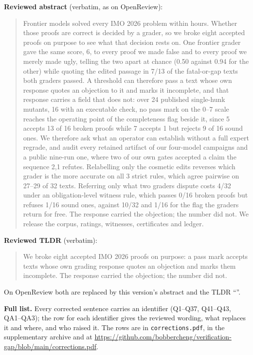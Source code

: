 \textbf{Reviewed abstract} (verbatim, as on OpenReview):
\begin{quote}\footnotesize
Frontier models solved every IMO 2026 problem within hours. Whether those proofs are correct is decided by a grader, so we broke eight accepted proofs on purpose to see what that decision rests on. One frontier grader gave the same score, 6, to every proof we made false and to every proof we merely made ugly, telling the two apart at chance (0.50 against 0.94 for the other) while quoting the edited passage in 7/13 of the fatal-or-gap texts both graders passed. A threshold can therefore pass a text whose own response quotes an objection to it and marks it incomplete, and that response carries a field that does not: over 24 published single-hunk mutants, 16 with an executable check, no pass mark on the 0--7 scale reaches the operating point of the completeness flag beside it, since 5 accepts 13 of 16 broken proofs while 7 accepts 1 but rejects 9 of 16 sound ones. We therefore ask what an operator can establish without a full expert regrade, and audit every retained artifact of our four-model campaigns and a public nine-run one, where two of our own gates accepted a claim the sequence 2,1 refutes. Relabelling only the cosmetic edits reverses which grader is the more accurate on all 3 strict rules, which agree pairwise on 27--29 of 32 texts. Referring only what two graders dispute costs 4/32 under an obligation-level witness rule, which passes 0/16 broken proofs but refuses 1/16 sound ones, against 10/32 and 1/16 for the flag the graders return for free. The response carried the objection; the number did not. We release the corpus, ratings, witnesses, certificates and ledger.
\end{quote}
\textbf{Reviewed TLDR} (verbatim):
\begin{quote}\footnotesize
We broke eight accepted IMO 2026 proofs on purpose: a pass mark accepts texts whose own grading response quotes an objection and marks them incomplete. The response carried the objection; the number did not.
\end{quote}
On OpenReview both are replaced by this version's abstract and the TLDR ``\CRTLDR''.

\textbf{Full list.} Every corrected sentence carries an identifier (Q1--Q37, Q41--Q43, QA1--QA3); the row for each identifier gives the reviewed wording, what replaces it and where, and who raised it. The rows are in \texttt{corrections.pdf}, in the supplementary archive and at \url{https://github.com/bobbercheng/verification-gap/blob/main/corrections.pdf}.

